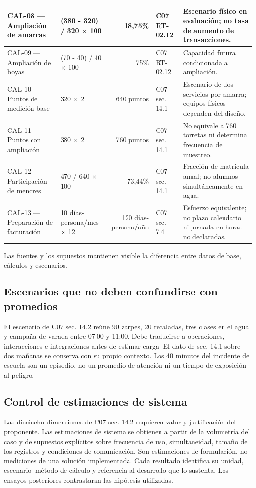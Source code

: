 \begin{longtable}{|L{0.176707\AnchoTablaAnexo}|L{0.204819\AnchoTablaAnexo}|R{0.148594\AnchoTablaAnexo}|L{0.116466\AnchoTablaAnexo}|L{0.353414\AnchoTablaAnexo}|}
CAL-08 — Ampliación de amarras & (380 - 320) / 320 \(\times\) 100 & 18,75\% & C07 RT-02.12 & Escenario físico en evaluación; no tasa de aumento de transacciones. \\ \hline
{}
CAL-09 — Ampliación de boyas & (70 - 40) / 40 \(\times\) 100 & 75\% & C07 RT-02.12 & Capacidad futura condicionada a ampliación. \\ \hline
CAL-10 — Puntos de medición base & 320 \(\times\) 2 & 640 puntos & C07 sec. 14.1 & Escenario de dos servicios por amarra; equipos físicos dependen del diseño. \\ \hline
{}
CAL-11 — Puntos con ampliación & 380 \(\times\) 2 & 760 puntos & C07 sec. 14.1 & No equivale a 760 torretas ni determina frecuencia de muestreo. \\ \hline
CAL-12 — Participación de menores & 470 / 640 \(\times\) 100 & 73,44\% & C07 sec. 14.1 & Fracción de matrícula anual; no alumnos simultáneamente en agua. \\ \hline
{}
CAL-13 — Preparación de facturación & 10 días-persona/mes \(\times\) 12 & 120 días-persona/año & C07 sec. 7.4 & Esfuerzo equivalente; no plazo calendario ni jornada en horas no declaradas. \\ \hline
\end{longtable}

Las fuentes y los supuestos mantienen visible la diferencia entre datos de base, cálculos y escenarios.

\subsection*{Escenarios que no deben confundirse con promedios}
El escenario de C07 sec. 14.2 reúne 90 zarpes, 20 recaladas, tres clases en el agua y campaña de varada entre 07:00 y 11:00. Debe traducirse a operaciones, interacciones e integraciones antes de estimar carga. El dato de sec. 14.1 sobre dos mañanas se conserva con su propio contexto. Los 40 minutos del incidente de escuela son un episodio, no un promedio de atención ni un tiempo de exposición al peligro.
\subsection*{Control de estimaciones de sistema}
Las dieciocho dimensiones de C07 sec. 14.2 requieren valor y justificación del proponente. Las estimaciones de sistema se obtienen a partir de la volumetría del caso y de supuestos explícitos sobre frecuencia de uso, simultaneidad, tamaño de los registros y condiciones de comunicación. Son estimaciones de formulación, no mediciones de una solución implementada. Cada resultado identifica su unidad, escenario, método de cálculo y referencia al desarrollo que lo sustenta. Los ensayos posteriores contrastarán las hipótesis utilizadas.

